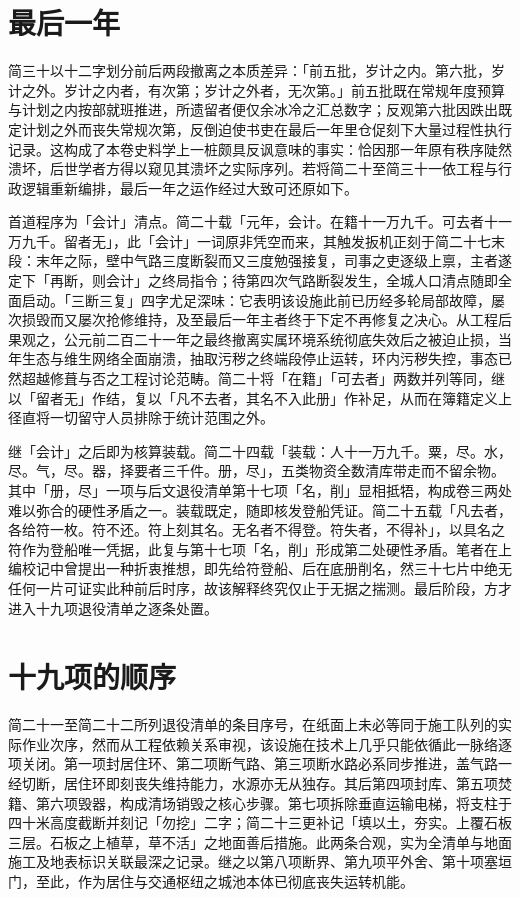 \section{最后一年}

简三十以十二字划分前后两段撤离之本质差异：「前五批，岁计之内。第六批，岁计之外。岁计之内者，有次第；岁计之外者，无次第。」前五批既在常规年度预算与计划之内按部就班推进，所遗留者便仅余冰冷之汇总数字；反观第六批因跌出既定计划之外而丧失常规次第，反倒迫使书吏在最后一年里仓促刻下大量过程性执行记录。这构成了本卷史料学上一桩颇具反讽意味的事实：恰因那一年原有秩序陡然溃坏，后世学者方得以窥见其溃坏之实际序列。若将简二十至简三十一依工程与行政逻辑重新编排，最后一年之运作经过大致可还原如下。

首道程序为「会计」清点。简二十载「元年，会计。在籍十一万九千。可去者十一万九千。留者无」，此「会计」一词原非凭空而来，其触发扳机正刻于简二十七末段：末年之际，壁中气路三度断裂而又三度勉强接复，司事之吏逐级上禀，主者遂定下「再断，则会计」之终局指令；待第四次气路断裂发生，全城人口清点随即全面启动。「三断三复」四字尤足深味：它表明该设施此前已历经多轮局部故障，屡次损毁而又屡次抢修维持，及至最后一年主者终于下定不再修复之决心。从工程后果观之，公元前二百二十一年之最终撤离实属环境系统彻底失效后之被迫止损，当年生态与维生网络全面崩溃，抽取污秽之终端段停止运转，环内污秽失控，事态已然超越修葺与否之工程讨论范畴。简二十将「在籍」「可去者」两数并列等同，继以「留者无」作结，复以「凡不去者，其名不入此册」作补足，从而在簿籍定义上径直将一切留守人员排除于统计范围之外。

继「会计」之后即为核算装载。简二十四载「装载：人十一万九千。粟，尽。水，尽。气，尽。器，择要者三千件。册，尽」，五类物资全数清库带走而不留余物。其中「册，尽」一项与后文退役清单第十七项「名，削」显相抵牾，构成卷三两处难以弥合的硬性矛盾之一。装载既定，随即核发登船凭证。简二十五载「凡去者，各给符一枚。符不还。符上刻其名。无名者不得登。符失者，不得补」，以具名之符作为登船唯一凭据，此复与第十七项「名，削」形成第二处硬性矛盾。笔者在上编校记中曾提出一种折衷推想，即先给符登船、后在底册削名，然三十七片中绝无任何一片可证实此种前后时序，故该解释终究仅止于无据之揣测。最后阶段，方才进入十九项退役清单之逐条处置。

\section{十九项的顺序}

简二十一至简二十二所列退役清单的条目序号，在纸面上未必等同于施工队列的实际作业次序，然而从工程依赖关系审视，该设施在技术上几乎只能依循此一脉络逐项关闭。第一项封居住环、第二项断气路、第三项断水路必系同步推进，盖气路一经切断，居住环即刻丧失维持能力，水源亦无从独存。其后第四项封库、第五项焚籍、第六项毁器，构成清场销毁之核心步骤。第七项拆除垂直运输电梯，将支柱于四十米高度截断并刻记「勿挖」二字；简二十三更补记「填以土，夯实。上覆石板三层。石板之上植草，草不活」之地面善后措施。此两条合观，实为全清单与地面施工及地表标识关联最深之记录。继之以第八项断界、第九项平外舍、第十项塞垣门，至此，作为居住与交通枢纽之城池本体已彻底丧失运转机能。

